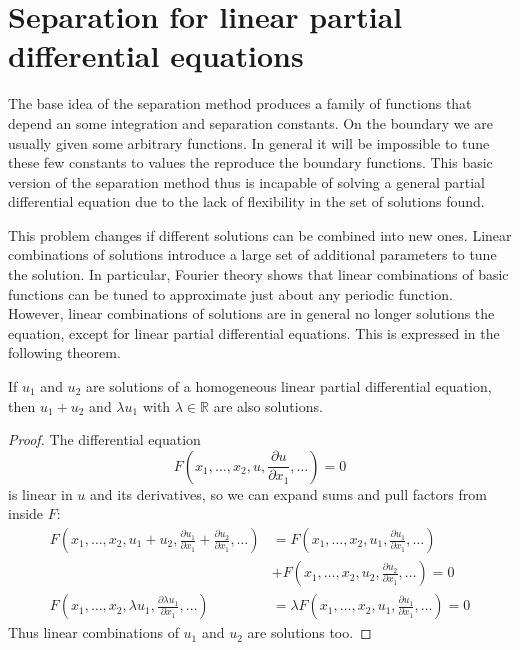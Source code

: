 %
%
%
\section{Separation for linear partial differential equations}
The base idea of the separation method produces a family of functions
that depend an some integration and separation constants.
On the boundary we are usually given some arbitrary functions.
In general it will be impossible to tune these few constants to
values the reproduce the boundary functions.
This basic version of the separation method thus is incapable of
solving a general partial differential equation due to the lack
of flexibility in the set of solutions found.

This problem changes if different solutions can be combined into new ones.
Linear combinations of solutions introduce a large set of additional
parameters to tune the solution.
In particular, Fourier theory shows that linear combinations of
basic functions can be tuned to approximate just about any periodic
function.
However, linear combinations of solutions are in general no longer
solutions the equation, except for linear partial differential
equations.
This is expressed in the following theorem.

\begin{satz}
If $u_1$ and $u_2$
are solutions of a homogeneous linear partial differential equation,
then $u_1+u_2$ and $\lambda u_1$ with $\lambda\in\mathbb R$ are also
solutions.
\end{satz}

\begin{proof}
The differential equation
\[
F(x_1,\dots,x_2,u,\frac{\partial u}{\partial x_1},\dots)=0
\]
is linear in $u$ and its derivatives, so we can expand sums and
pull factors from inside $F$:
\begin{align*}
F(x_1,\dots,x_2,u_1+u_2,\frac{\partial u_1}{\partial x_1}+\frac{\partial u_2}{\partial x_1},\dots)
&=
F(x_1,\dots,x_2,u_1,\frac{\partial u_1}{\partial x_1},\dots)
\\
&+
F(x_1,\dots,x_2,u_2,\frac{\partial u_2}{\partial x_1},\dots)=0
\\
F(x_1,\dots,x_2,\lambda u_1,\frac{\partial \lambda u_1}{\partial x_1},\dots)
&=
\lambda
F(x_1,\dots,x_2,u_1,\frac{\partial u_1}{\partial x_1},\dots)
=0
\end{align*}
Thus linear combinations of $u_1$ and $u_2$ are solutions too.
\end{proof}

